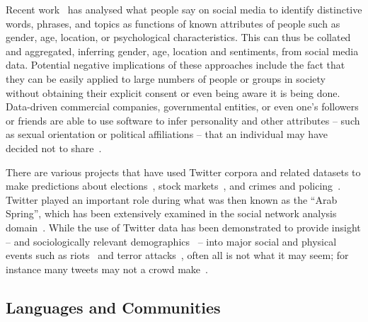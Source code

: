 \documentclass[conference]{IEEEtran}
\begin{document}

Recent
work~\cite{blamey-et-al-2012,schwartz-et-al:2013,blamey-et-al-2013,oatley+crick:2014,oatley-et-al-soccogcomp2015}
has analysed what people say on social media to identify distinctive
words, phrases, and topics as functions of known attributes of people
such as gender, age, location, or psychological characteristics. This
can thus be collated and aggregated, inferring gender, age, location
and sentiments, from social media data. Potential negative
implications of these approaches include the fact that they can be
easily applied to large numbers of people or groups in society without
obtaining their explicit consent or even being aware it is being
done. Data-driven commercial companies, governmental entities, or
even one's followers or friends are able to use software to infer
personality and other attributes -- such as sexual orientation or
political affiliations -- that an individual may have decided not to
share~\cite{lambiotte+kosinski:2014,postsm:2014}.

There are various projects that have used Twitter corpora and related
datasets to make predictions about
elections~\cite{tumasjan-et-al:2010}, stock
markets~\cite{zhang-et-al:2011}, and crimes and
policing~\cite{gerber:2014,oatley+crick_fosintsi2014,oatley+crick:2015}. Twitter
played an important role during what was then known as the ``Arab
Spring'', which has been extensively examined in the social network
analysis
domain~\cite{lotan-et-al:2011,howard-et-al:2011,comunello+anzera:2012,wolfsfeld-et-al:2013,bruns-et-al:2013}.
While the use of Twitter data has been demonstrated to provide insight
-- and sociologically relevant demographics~\cite{sloan-et-al:2013} --
into major social and physical events such as
riots~\cite{procter-et-al:2013} and terror
attacks~\cite{burnap-et-al:2014}, often all is not what it may seem;
for instance many tweets may not a crowd make~\cite{liang-et-al:2013}.

\subsection{Languages and Communities}
\end{document}
